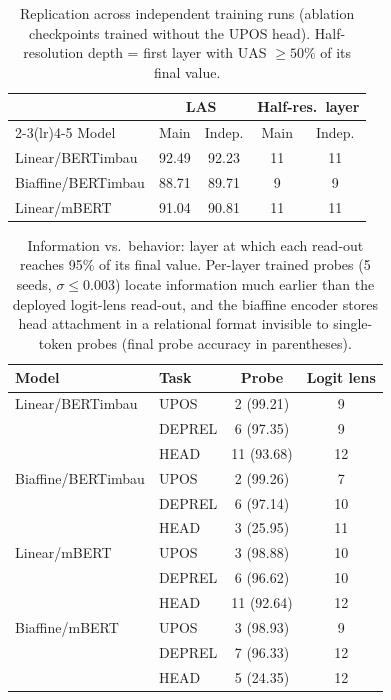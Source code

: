 \begin{table}[t]
\centering
\caption{Replication across independent training runs (ablation checkpoints trained without the UPOS head). Half-resolution depth = first layer with UAS $\geq 50\%$ of its final value.}
\label{tab:replication}
\begin{tabular}{lcccc}
\toprule
 & \multicolumn{2}{c}{LAS} & \multicolumn{2}{c}{Half-res.\ layer} \\
\cmidrule(lr){2-3}\cmidrule(lr){4-5}
Model & Main & Indep. & Main & Indep. \\
\midrule
Linear/BERTimbau & 92.49 & 92.23 & 11 & 11 \\
Biaffine/BERTimbau & 88.71 & 89.71 & 9 & 9 \\
Linear/mBERT & 91.04 & 90.81 & 11 & 11 \\
\bottomrule
\end{tabular}
\end{table}

\begin{table}[t]
\centering
\caption{Information vs.\ behavior: layer at which each read-out reaches 95\% of its final value. Per-layer trained probes (5 seeds, $\sigma \leq 0.003$) locate information much earlier than the deployed logit-lens read-out, and the biaffine encoder stores head attachment in a relational format invisible to single-token probes (final probe accuracy in parentheses).}
\label{tab:probes}
\begin{tabular}{llcc}
\toprule
Model & Task & Probe & Logit lens \\
\midrule
Linear/BERTimbau & UPOS & 2 (99.21) & 9 \\
 & DEPREL & 6 (97.35) & 9 \\
 & HEAD & 11 (93.68) & 12 \\
\midrule
Biaffine/BERTimbau & UPOS & 2 (99.26) & 7 \\
 & DEPREL & 6 (97.14) & 10 \\
 & HEAD & 3 (25.95) & 11 \\
\midrule
Linear/mBERT & UPOS & 3 (98.88) & 10 \\
 & DEPREL & 6 (96.62) & 10 \\
 & HEAD & 11 (92.64) & 12 \\
\midrule
Biaffine/mBERT & UPOS & 3 (98.93) & 9 \\
 & DEPREL & 7 (96.33) & 12 \\
 & HEAD & 5 (24.35) & 12 \\
\bottomrule
\end{tabular}
\end{table}

